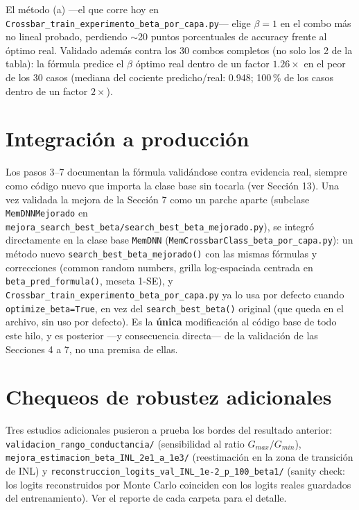\documentclass[11pt]{article}
\begin{document}
El método (a) —el que corre hoy en \texttt{Crossbar\_train\_experimento\_beta\_por\_capa.py}—
elige $\beta=1$ en el combo más no lineal probado, perdiendo $\sim$20 puntos porcentuales de
accuracy frente al óptimo real. Validado además contra los 30 combos completos (no solo los 2
de la tabla): la fórmula predice el $\beta$ óptimo real dentro de un factor $1.26\times$ en el
peor de los 30 casos (mediana del cociente predicho/real: 0.948; 100\,\% de los casos dentro
de un factor $2\times$).

\section{Integración a producción}

Los pasos 3--7 documentan la fórmula validándose contra evidencia real, siempre como código
nuevo que importa la clase base sin tocarla (ver Sección 13). Una vez validada la mejora de la
Sección 7 como un parche aparte (subclase \texttt{MemDNNMejorado} en
\texttt{mejora\_search\_best\_beta/search\_best\_beta\_mejorado.py}), se integró directamente
en la clase base \texttt{MemDNN} (\texttt{MemCrossbarClass\_beta\_por\_capa.py}): un método
nuevo \texttt{search\_best\_beta\_mejorado()} con las mismas fórmulas y correcciones (common
random numbers, grilla log-espaciada centrada en \texttt{beta\_pred\_formula()}, meseta 1-SE),
y \texttt{Crossbar\_train\_experimento\_beta\_por\_capa.py} ya lo usa por defecto cuando
\texttt{optimize\_beta=True}, en vez del \texttt{search\_best\_beta()} original (que queda en
el archivo, sin uso por defecto). Es la \textbf{única} modificación al código base de todo
este hilo, y es posterior —y consecuencia directa— de la validación de las Secciones 4 a 7, no
una premisa de ellas.

\section{Chequeos de robustez adicionales}

Tres estudios adicionales pusieron a prueba los bordes del resultado anterior:
\texttt{validacion\_rango\_conductancia/} (sensibilidad al ratio $G_{max}/G_{min}$),
\texttt{mejora\_estimacion\_beta\_INL\_2e1\_a\_1e3/} (reestimación en la zona de transición de
INL) y \texttt{reconstruccion\_logits\_val\_INL\_1e-2\_p\_100\_beta1/} (sanity check: los
logits reconstruidos por Monte Carlo coinciden con los logits reales guardados del
entrenamiento). Ver el reporte de cada carpeta para el detalle.
\end{document}
